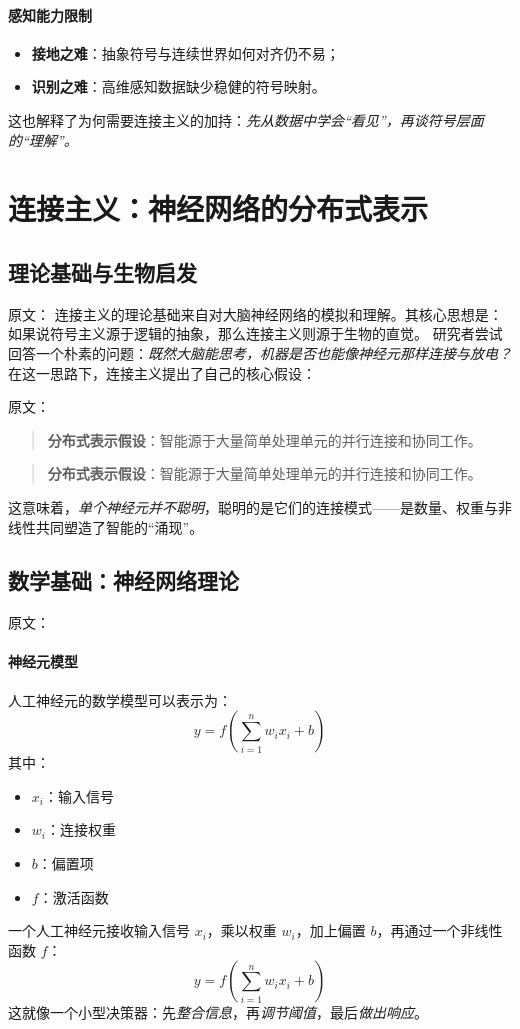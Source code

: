\paragraph{感知能力限制}
\begin{itemize}
\item \textbf{接地之难}：抽象符号与连续世界如何对齐仍不易；
\item \textbf{识别之难}：高维感知数据缺少稳健的符号映射。
\end{itemize}
这也解释了为何需要连接主义的加持：\emph{先从数据中学会“看见”，再谈符号层面的“理解”。}

\section{连接主义：神经网络的分布式表示}

\subsection{理论基础与生物启发}

原文：
连接主义的理论基础来自对大脑神经网络的模拟和理解。其核心思想是：
如果说符号主义源于逻辑的抽象，那么连接主义则源于生物的直觉。  
研究者尝试回答一个朴素的问题：\emph{既然大脑能思考，机器是否也能像神经元那样连接与放电？}  
在这一思路下，连接主义提出了自己的核心假设：

原文：
\begin{quote}
\textbf{分布式表示假设}：智能源于大量简单处理单元的并行连接和协同工作。
\end{quote}
\begin{quote}
\textbf{分布式表示假设}：智能源于大量简单处理单元的并行连接和协同工作。
\end{quote}
这意味着，\emph{单个神经元并不聪明}，聪明的是它们的连接模式——是数量、权重与非线性共同塑造了智能的“涌现”。

\subsection{数学基础：神经网络理论}

原文：
\paragraph{神经元模型}
人工神经元的数学模型可以表示为：
$$y = f\left(\sum_{i=1}^{n} w_i x_i + b\right)$$
其中：
\begin{itemize}
\item $x_i$：输入信号
\item $w_i$：连接权重
\item $b$：偏置项
\item $f$：激活函数
\end{itemize}
一个人工神经元接收输入信号 $x_i$，乘以权重 $w_i$，加上偏置 $b$，再通过一个非线性函数 $f$：  
$$y = f\left(\sum_{i=1}^{n} w_i x_i + b\right)$$
这就像一个小型决策器：先\emph{整合信息}，再\emph{调节阈值}，最后\emph{做出响应}。

